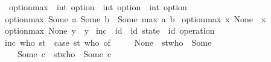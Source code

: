 \begin{isabellebody}%
\isamarkupfalse%
\ option{\isacharunderscore}max\ {\isacharcolon}{\isacharcolon}\ {\isachardoublequoteopen}int\ option\ {\isasymRightarrow}\ int\ option\ {\isasymRightarrow}\ int\ option{\isachardoublequoteclose}\ \ \isanewline
{\isachardoublequoteopen}option{\isacharunderscore}max\ {\isacharparenleft}Some\ a{\isacharparenright}\ {\isacharparenleft}Some\ b{\isacharparenright}\ {\isacharequal}\ Some\ {\isacharparenleft}max\ a\ b{\isacharparenright}{\isachardoublequoteclose}\ {\isacharbar}\isanewline
{\isachardoublequoteopen}option{\isacharunderscore}max\ x\ None\ {\isacharequal}\ x{\isachardoublequoteclose}\ {\isacharbar}\isanewline
{\isachardoublequoteopen}option{\isacharunderscore}max\ None\ y\ {\isacharequal}\ y{\isachardoublequoteclose}\isanewline
\isanewline
{}\isamarkupfalse%
\ inc\ {\isacharcolon}{\isacharcolon}\ {\isachardoublequoteopen}{\isacharprime}id\ {\isasymRightarrow}\ {\isacharparenleft}{\isacharprime}id\ state{\isacharparenright}\ {\isasymRightarrow}\ {\isacharparenleft}{\isacharprime}id\ operation{\isacharparenright}{\isachardoublequoteclose}\ \isanewline
{\isachardoublequoteopen}inc\ who\ st\ {\isacharequal}\ {\isacharparenleft}case\ {\isacharparenleft}st\ who{\isacharparenright}\ of\ \isanewline
\ \ \ \ None\ {\isasymRightarrow}\ st{\isacharparenleft}who\ {\isacharcolon}{\isacharequal}\ Some\ {}{\isacharparenright}\isanewline
\ \ {\isacharbar}\ Some\ c\ {\isasymRightarrow}\ st{\isacharparenleft}who\ {\isacharcolon}{\isacharequal}\ Some\ {\isacharparenleft}c\ {\isacharplus}\ {}{\isacharparenright}{\isacharparenright}{\isacharparenright}{\isachardoublequoteclose}\isanewline
\end{isabellebody}
